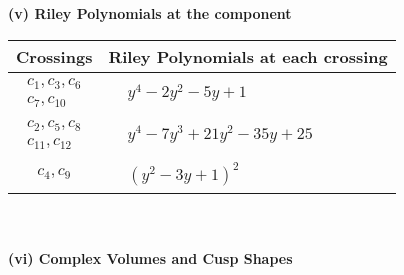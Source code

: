 \documentclass[1p]{elsarticle_modified}
\theoremstyle{definition}
\begin{document}
\newpage\renewcommand{\arraystretch}{1}
\flushleft \textbf{(v) Riley Polynomials at the component}\newline \\
\begin{tabular}{m{50pt}|m{274pt}}
Crossings & \hspace{64pt}Riley Polynomials at each crossing \\
\hline $$\begin{aligned}c_{1},c_{3},c_{6}\\c_{7},c_{10}\end{aligned}$$&$\begin{aligned}
&y^4-2 y^2-5 y+1
\end{aligned}$\\
\hline $$\begin{aligned}c_{2},c_{5},c_{8}\\c_{11},c_{12}\end{aligned}$$&$\begin{aligned}
&y^4-7 y^3+21 y^2-35 y+25
\end{aligned}$\\
\hline $$\begin{aligned}c_{4},c_{9}\end{aligned}$$&$\begin{aligned}
&(y^2-3 y+1)^2
\end{aligned}$\\
\hline
\end{tabular}\\~\\
\newpage\flushleft \textbf{(vi) Complex Volumes and Cusp Shapes}
\end{document}
